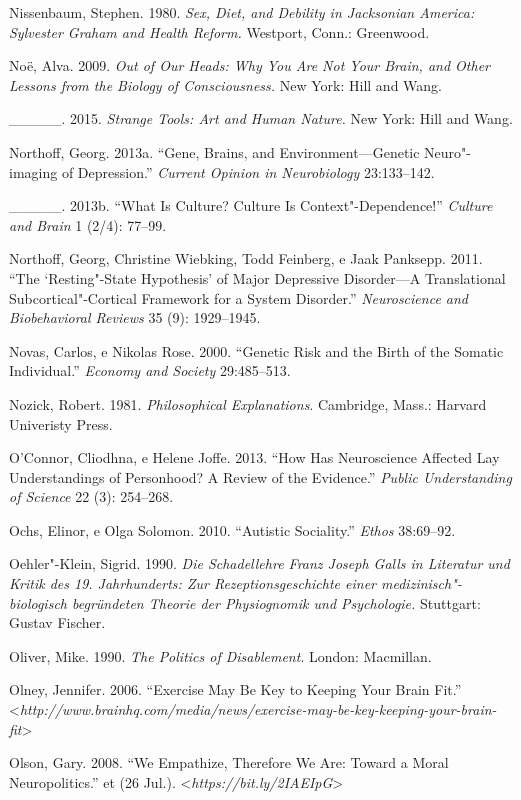{\begin{Parskip}
Nissenbaum, Stephen. 1980. \emph{Sex, Diet, and Debility in Jacksonian
America: Sylvester Graham and Health Reform.} Westport, Conn.:
Greenwood.

Noë, Alva. 2009. \emph{Out of Our Heads: Why You Are Not Your Brain, and
Other Lessons from the Biology of Consciousness.} New York: Hill and
Wang.

\_\_\_\_\_. 2015. \emph{Strange Tools: Art and Human Nature.} New York:
Hill and Wang.

Northoff, Georg. 2013a. ``Gene, Brains, and Environment---Genetic
Neuro"-imaging of Depression.'' \emph{Current Opinion in Neurobiology}
23:133--142.

\_\_\_\_\_. 2013b. ``What Is Culture? Culture Is Context"-Dependence!''
\emph{Culture and Brain} 1 (2/4): 77--99.

Northoff, Georg, Christine Wiebking, Todd Feinberg, e Jaak Panksepp.
2011. ``The `Resting"-State Hypothesis' of Major Depressive Disorder---A
Translational Subcortical"-Cortical Framework for a System Disorder.''
\emph{Neuroscience and Biobehavioral Reviews} 35 (9): 1929--1945.

Novas, Carlos, e Nikolas Rose. 2000. ``Genetic Risk and the Birth of the
Somatic Individual.'' \emph{Economy and Society} 29:485--513.

Nozick, Robert. 1981. \emph{Philosophical Explanations}. Cambridge,
Mass.: Harvard Univeristy Press.

O'Connor, Cliodhna, e Helene Joffe. 2013. ``How Has Neuroscience
Affected Lay Understandings of Personhood? A Review of the Evidence.''
\emph{Public Understanding of Science} 22 (3): 254--268.

Ochs, Elinor, e Olga Solomon. 2010. ``Autistic Sociality.'' \emph{Ethos}
38:69--92.

Oehler"-Klein, Sigrid. 1990. \emph{Die Schadellehre Franz Joseph Galls in
Literatur und Kritik des 19. Jahrhunderts: Zur Rezeptionsgeschichte
einer medizinisch"-biologisch begründeten Theorie der Physiognomik und
Psychologie.} Stuttgart: Gustav Fischer.

Oliver, Mike. 1990. \emph{The Politics of Disablement}. London:
Macmillan.

Olney, Jennifer. 2006. ``Exercise May Be Key to Keeping Your Brain
Fit.''
\textless{}\emph{http://www.brainhq.com/media/news/exercise-may-be-key-keeping-your-brain-fit}\textgreater{}

Olson, Gary. 2008. ``We Empathize, Therefore We Are: Toward a Moral
Neuropolitics.'' et (26 Jul.).
\textless{}\emph{https://bit.ly/2IAEIpG}\textgreater{}


\end{Parskip}}

